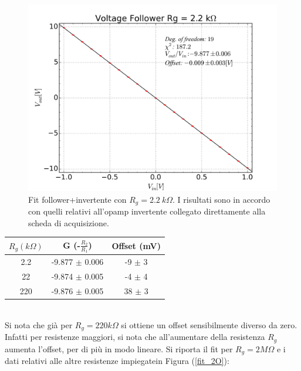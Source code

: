 \documentclass[journal, a4paper]{IEEEtran}
\begin{document}
\begin{figure}[htp]
\centering
\includegraphics[scale=.35]{fit_follower_1_21_2k_2k_22k}
\caption{Fit follower+invertente con $R_g = 2.2~k\Omega$. I risultati sono in accordo con quelli relativi all'opamp invertente collegato direttamente alla scheda di acquisizione.}
\end{figure}

\begin{center}
\begin{tabular}{|c|c|c|}
\hline 
$R_g (k\Omega)$ & G (-$\frac{R_2}{R_1}$) & Offset (mV) \\ 
\hline 
2.2 & -9.877 $\pm$ 0.006 & -9 $\pm$ 3 \\ 
\hline 
22 & -9.874 $\pm$ 0.005 & -4 $\pm$ 4 \\ 
\hline 
220 & -9.876 $\pm$ 0.005 & 38 $\pm$ 3 \\ 
\hline 
\end{tabular} 
\end{center}

~\\
Si nota che già per $R_g = 220 k\Omega$ si ottiene un offset sensibilmente diverso da zero. Infatti per resistenze maggiori, si nota che all'aumentare della resistenza $R_g$ aumenta l'offset, per di più in modo lineare. Si riporta il fit per $R_g = 2 M\Omega$ e i dati relativi alle altre resistenze impiegatein Figura (\ref{fit_2O}):
\end{document}
